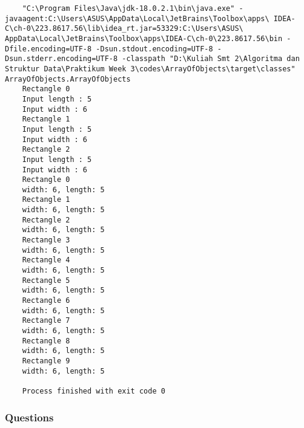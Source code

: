 \documentclass[12pt,titlepage]{article}
\begin{document}
\begin{verbatim}
    "C:\Program Files\Java\jdk-18.0.2.1\bin\java.exe" - javaagent:C:\Users\ASUS\AppData\Local\JetBrains\Toolbox\apps\ IDEA-C\ch-0\223.8617.56\lib\idea_rt.jar=53329:C:\Users\ASUS\ AppData\Local\JetBrains\Toolbox\apps\IDEA-C\ch-0\223.8617.56\bin -Dfile.encoding=UTF-8 -Dsun.stdout.encoding=UTF-8 -Dsun.stderr.encoding=UTF-8 -classpath "D:\Kuliah Smt 2\Algoritma dan Struktur Data\Praktikum Week 3\codes\ArrayOfObjects\target\classes" ArrayOfObjects.ArrayOfObjects
    Rectangle 0
    Input length : 5
    Input width : 6
    Rectangle 1
    Input length : 5
    Input width : 6
    Rectangle 2
    Input length : 5
    Input width : 6
    Rectangle 0
    width: 6, length: 5
    Rectangle 1
    width: 6, length: 5
    Rectangle 2
    width: 6, length: 5
    Rectangle 3
    width: 6, length: 5
    Rectangle 4
    width: 6, length: 5
    Rectangle 5
    width: 6, length: 5
    Rectangle 6
    width: 6, length: 5
    Rectangle 7
    width: 6, length: 5
    Rectangle 8
    width: 6, length: 5
    Rectangle 9
    width: 6, length: 5

    Process finished with exit code 0

\end{verbatim}

\subsubsection{Questions}
\end{document}
